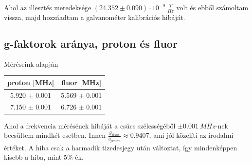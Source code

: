 \documentclass[a4paper,12pt]{article}
\begin{document}
\par Ahol az illesztés meredeksége $(24.352 \pm 0.090) \cdot 10^{-9} ~\frac{T}{Hz}$ volt és ebből számoltam vissza, majd hozzáadtam a galvanométer kalibrációs hibáját.

\subsection{ g-faktorok aránya, proton és fluor}

\par Méréseink alapján

\begin{center}
\begin{tabular}{|c|c|} \hline
proton [MHz] & fluor [MHz] \\ \hline
5.920 $\pm$ 0.001 &	5.569 $\pm$ 0.001 \\ \hline
7.150 $\pm$ 0.001 &	6.726 $\pm$ 0.001 \\ \hline
\end{tabular}
\end{center}

\par Ahol a frekvencia mérésének hibáját a csúcs szélességéből $\pm 0.001 ~MHz$-nek becsültem mindkét esetben. Innen $\frac{g_{fluor}}{g_{proton}} \approx 0.9407$, ami jól közelíti az irodalmi értéket. A hiba csak a harmadik tizedesjegy után változtat, így mindenképpen kisebb a hiba, mint $5\%$-ék. 
\end{document}
